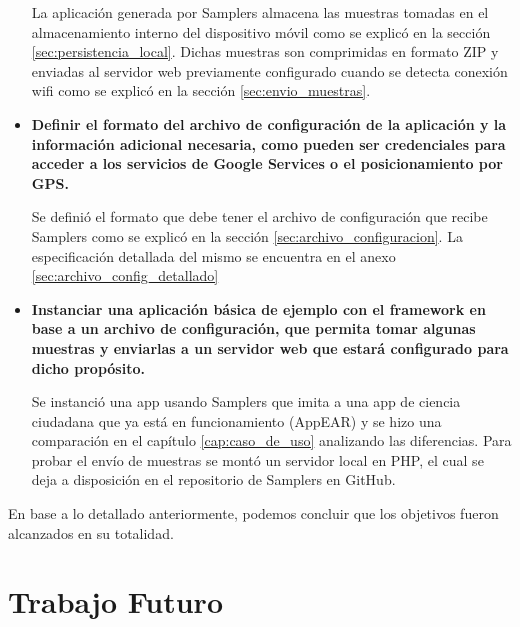 \begin{itemize}
  
  La aplicación generada por Samplers almacena las muestras tomadas en el almacenamiento interno del dispositivo móvil como se explicó en la sección \ref{sec:persistencia_local}. Dichas muestras son comprimidas en formato ZIP y enviadas al servidor web previamente configurado cuando se detecta conexión wifi como se explicó en la sección \ref{sec:envio_muestras}.
  
  
    \item \textbf{Definir el formato del archivo de configuración de la aplicación y la información adicional necesaria, como pueden ser credenciales para acceder a los servicios de Google Services o el posicionamiento por GPS.}
  
  
  Se definió el formato que debe tener el archivo de configuración que recibe Samplers como se explicó en la sección \ref{sec:archivo_configuracion}. La especificación detallada del mismo se encuentra en el anexo \ref{sec:archivo_config_detallado}
  
  
      \item \textbf{Instanciar una aplicación básica de ejemplo con el framework en base a un archivo de configuración, que permita tomar algunas muestras y enviarlas a un servidor web que estará configurado para dicho propósito.}
  
  
Se instanció una app usando Samplers que imita a una app de ciencia ciudadana que ya está en funcionamiento (AppEAR) y se hizo una comparación en el capítulo \ref{cap:caso_de_uso} analizando las diferencias. Para probar el envío de muestras se montó un servidor local en PHP, el cual se deja a disposición en el repositorio de Samplers en GitHub.
  

\end{itemize}

En base a lo detallado anteriormente, podemos concluir que los objetivos fueron alcanzados en su totalidad.



\section{Trabajo Futuro}

